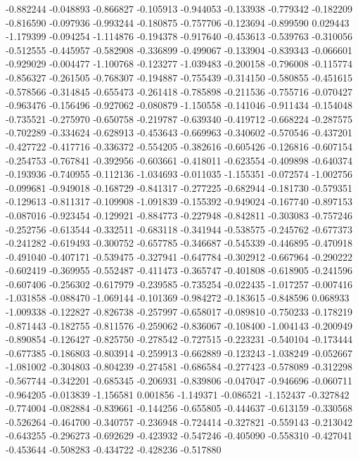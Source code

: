 -0.882244
-0.048893
-0.866827
-0.105913
-0.944053
-0.133938
-0.779342
-0.182209
-0.816590
-0.097936
-0.993244
-0.180875
-0.757706
-0.123694
-0.899590
0.029443
-1.179399
-0.094254
-1.114876
-0.194378
-0.917640
-0.453613
-0.539763
-0.310056
-0.512555
-0.445957
-0.582908
-0.336899
-0.499067
-0.133904
-0.839343
-0.066601
-0.929029
-0.004477
-1.100768
-0.123277
-1.039483
-0.200158
-0.796008
-0.115774
-0.856327
-0.261505
-0.768307
-0.194887
-0.755439
-0.314150
-0.580855
-0.451615
-0.578566
-0.314845
-0.655473
-0.261418
-0.785898
-0.211536
-0.755716
-0.070427
-0.963476
-0.156496
-0.927062
-0.080879
-1.150558
-0.141046
-0.911434
-0.154048
-0.735521
-0.275970
-0.650758
-0.219787
-0.639340
-0.419712
-0.668224
-0.287575
-0.702289
-0.334624
-0.628913
-0.453643
-0.669963
-0.340602
-0.570546
-0.437201
-0.427722
-0.417716
-0.336372
-0.554205
-0.382616
-0.605426
-0.126816
-0.607154
-0.254753
-0.767841
-0.392956
-0.603661
-0.418011
-0.623554
-0.409898
-0.640374
-0.193936
-0.740955
-0.112136
-1.034693
-0.011035
-1.155351
-0.072574
-1.002756
-0.099681
-0.949018
-0.168729
-0.841317
-0.277225
-0.682944
-0.181730
-0.579351
-0.129613
-0.811317
-0.109908
-1.091839
-0.155392
-0.949024
-0.167740
-0.897153
-0.087016
-0.923454
-0.129921
-0.884773
-0.227948
-0.842811
-0.303083
-0.757246
-0.252756
-0.613544
-0.332511
-0.683118
-0.341944
-0.538575
-0.245762
-0.677373
-0.241282
-0.619493
-0.300752
-0.657785
-0.346687
-0.545339
-0.446895
-0.470918
-0.491040
-0.407171
-0.539475
-0.327941
-0.647784
-0.302912
-0.667964
-0.290222
-0.602419
-0.369955
-0.552487
-0.411473
-0.365747
-0.401808
-0.618905
-0.241596
-0.607406
-0.256302
-0.617979
-0.239585
-0.735254
-0.022435
-1.017257
-0.007416
-1.031858
-0.088470
-1.069144
-0.101369
-0.984272
-0.183615
-0.848596
0.068933
-1.009338
-0.122827
-0.826738
-0.257997
-0.658017
-0.089810
-0.750233
-0.178219
-0.871443
-0.182755
-0.811576
-0.259062
-0.836067
-0.108400
-1.004143
-0.200949
-0.890854
-0.126427
-0.825750
-0.278542
-0.727515
-0.223231
-0.540104
-0.173444
-0.677385
-0.186803
-0.803914
-0.259913
-0.662889
-0.123243
-1.038249
-0.052667
-1.081002
-0.304803
-0.804239
-0.274581
-0.686584
-0.277423
-0.578089
-0.312298
-0.567744
-0.342201
-0.685345
-0.206931
-0.839806
-0.047047
-0.946696
-0.060711
-0.964205
-0.013839
-1.156581
0.001856
-1.149371
-0.086521
-1.152437
-0.327842
-0.774004
-0.082884
-0.839661
-0.144256
-0.655805
-0.444637
-0.613159
-0.330568
-0.526264
-0.464700
-0.340757
-0.236948
-0.724414
-0.327821
-0.559143
-0.213042
-0.643255
-0.296273
-0.692629
-0.423932
-0.547246
-0.405090
-0.558310
-0.427041
-0.453644
-0.508283
-0.434722
-0.428236
-0.517880
